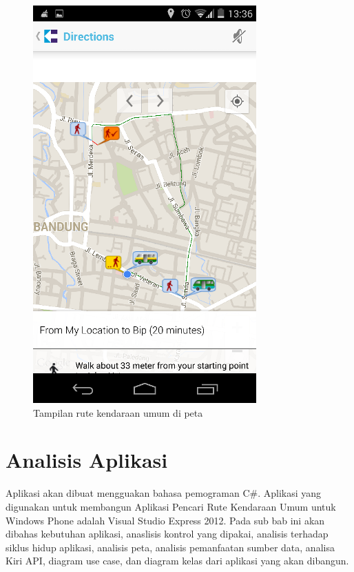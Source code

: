 \begin{figure}[h]
	\centering
		\includegraphics[scale=0.5]{Gambar/KIRI_Android/tampilan_peta}
	\caption{Tampilan rute kendaraan umum di peta}
	\label{fig:peta}
\end{figure}

\clearpage

\section{Analisis Aplikasi}
\label{lab:Analisis Aplikasi}
\hspace{0.5cm} Aplikasi akan dibuat mengguakan bahasa pemograman C\#. Aplikasi yang digunakan untuk membangun Aplikasi Pencari Rute Kendaraan Umum untuk Windows Phone adalah Visual Studio Express 2012. Pada sub bab ini akan dibahas kebutuhan aplikasi, anaslisis kontrol yang dipakai, analisis terhadap siklus hidup aplikasi, analisis peta, analisis pemanfaatan sumber data, analisa Kiri API, diagram use case, dan diagram kelas dari aplikasi yang akan dibangun. 

